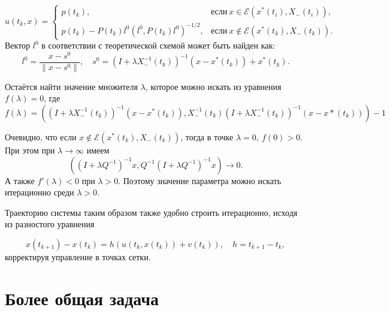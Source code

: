 \begin{equation*}
    u(t_k, x) = \begin{cases}
        p(t_k), & \text{если} \ x \in \mathcal{E}(x^*(t_i), X_-(t_i)), \\
        p(t_k) - P(t_k)l^0(l^0, P(t_k)l^0)^{-1/2}, & \text{если} \ x \notin \mathcal{E}(x^*(t_k), X_-(t_k)). 
    \end{cases}
\end{equation*}
Вектор \( l^0 \) в соответствии с теоретической схемой может быть найден как:
\begin{equation}
    l^0 = \frac{x - s^0}{\| x - s^0 \|}, \quad s^0 = (I + \lambda X_-^{-1}(t_k))^{-1}(x - x^*(t_k)) + x^*(t_k).
\end{equation}

Остаётся найти значение множителя \( \lambda \), которое можно искать из уравнения \( f(\lambda) = 0 \), где
\begin{equation*}
    f(\lambda) = ((I + \lambda X_-^{-1}(t_k))^{-1}(x - x^*(t_k)), X_-^{-1}(t_k)(I + \lambda X_-^{-1}(t_k))^{-1}(x - x*(t_k))) - 1
\end{equation*}

Очевидно, что если \( x \notin \mathcal{E}(x^*(t_k), X_-(t_k)) \), тогда в точке \( \lambda = 0, \ f(0) > 0 \).
При этом при \( \lambda \to \infty \) имеем
\begin{equation}
    ((I + \lambda Q^{-1})^{-1}x, Q^{-1}(I + \lambda Q^{-1})^{-1}x ) \to 0.
\end{equation}
А также \( f'(\lambda) < 0 \) при  \( \lambda > 0. \) Поэтому значение параметра можно искать итерационно среди 
 \( \lambda > 0 \). 

Траекторию системы таким образом также удобно строить итерационно, исходя из разностого уравнения

\begin{equation*}
    x(t_{k+1}) - x(t_k) = h(u(t_k, x(t_k)) + v(t_k)), \quad h = t_{k+1} - t_k,
\end{equation*}
корректируя управление в точках сетки.

\section{Более общая задача}

